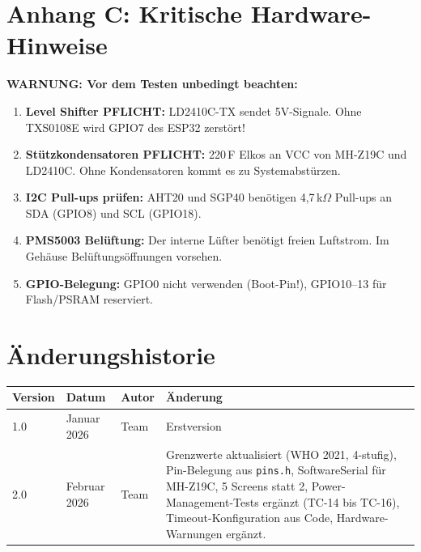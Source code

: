 \documentclass[a4paper,11pt]{article}
\begin{document}
\section*{Anhang C: Kritische Hardware-Hinweise}

\textbf{WARNUNG: Vor dem Testen unbedingt beachten:}

\begin{enumerate}[nosep]
\item \textbf{Level Shifter PFLICHT:} LD2410C-TX sendet 5V-Signale. Ohne TXS0108E wird GPIO7 des ESP32 zerstört!
\item \textbf{Stützkondensatoren PFLICHT:} 220\,\textmu F Elkos an VCC von MH-Z19C und LD2410C. Ohne Kondensatoren kommt es zu Systemabstürzen.
\item \textbf{I2C Pull-ups prüfen:} AHT20 und SGP40 benötigen 4{,}7\,k$\Omega$ Pull-ups an SDA (GPIO8) und SCL (GPIO18).
\item \textbf{PMS5003 Belüftung:} Der interne Lüfter benötigt freien Luftstrom. Im Gehäuse Belüftungsöffnungen vorsehen.
\item \textbf{GPIO-Belegung:} GPIO0 nicht verwenden (Boot-Pin!), GPIO10--13 für Flash/PSRAM reserviert.
\end{enumerate}

\section{Änderungshistorie}

\begin{tabularx}{\textwidth}{l l l X}
\toprule
\rowcolor{tableheader}
\textbf{Version} & \textbf{Datum} & \textbf{Autor} & \textbf{Änderung} \\
\midrule
1.0 & Januar 2026 & Team & Erstversion \\
2.0 & Februar 2026 & Team & Grenzwerte aktualisiert (WHO 2021, 4-stufig), Pin-Belegung aus \texttt{pins.h}, SoftwareSerial für MH-Z19C, 5 Screens statt 2, Power-Management-Tests ergänzt (TC-14 bis TC-16), Timeout-Konfiguration aus Code, Hardware-Warnungen ergänzt. \\
\bottomrule
\end{tabularx}
\end{document}
